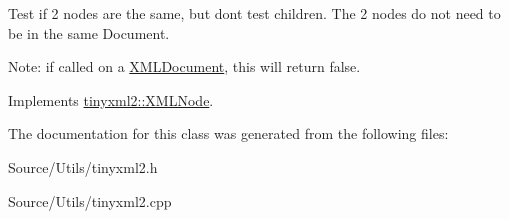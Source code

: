 Test if 2 nodes are the same, but don\textquotesingle{}t test children. The 2 nodes do not need to be in the same Document.

Note\+: if called on a \mbox{\hyperlink{classtinyxml2_1_1_x_m_l_document}{X\+M\+L\+Document}}, this will return false. 

Implements \mbox{\hyperlink{classtinyxml2_1_1_x_m_l_node_a7ce18b751c3ea09eac292dca264f9226}{tinyxml2\+::\+X\+M\+L\+Node}}.



The documentation for this class was generated from the following files\+:\begin{DoxyCompactItemize}
\item 
Source/\+Utils/tinyxml2.\+h\item 
Source/\+Utils/tinyxml2.\+cpp\end{DoxyCompactItemize}
